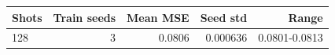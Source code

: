 \begin{tabular}{lrrrr}
\toprule
Shots & Train seeds & Mean MSE & Seed std & Range \\
\midrule
128 & 3 & 0.0806 & 0.000636 & 0.0801-0.0813 \\
\bottomrule
\end{tabular}
